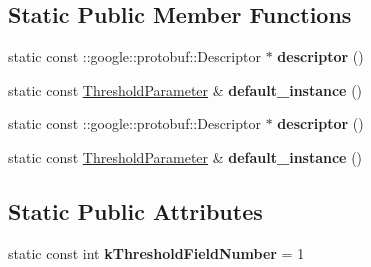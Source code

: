 \subsection*{Static Public Member Functions}
\begin{DoxyCompactItemize}
\item 
\mbox{\label{classcaffe_1_1_threshold_parameter_ac5ccc6db253564ef96fd9e65ddc4397e}} 
static const \+::google\+::protobuf\+::\+Descriptor $\ast$ {\bfseries descriptor} ()
\item 
\mbox{\label{classcaffe_1_1_threshold_parameter_aa4315dbfc60625e4375b7abf88d1646e}} 
static const \mbox{\hyperlink{classcaffe_1_1_threshold_parameter}{Threshold\+Parameter}} \& {\bfseries default\+\_\+instance} ()
\item 
\mbox{\label{classcaffe_1_1_threshold_parameter_a7fe6ef6623a56aadbdcf2f7c9a2e8da5}} 
static const \+::google\+::protobuf\+::\+Descriptor $\ast$ {\bfseries descriptor} ()
\item 
\mbox{\label{classcaffe_1_1_threshold_parameter_a4914b0e135a3d93145c789981d5adc0e}} 
static const \mbox{\hyperlink{classcaffe_1_1_threshold_parameter}{Threshold\+Parameter}} \& {\bfseries default\+\_\+instance} ()
\end{DoxyCompactItemize}
\subsection*{Static Public Attributes}
\begin{DoxyCompactItemize}
\item 
\mbox{\label{classcaffe_1_1_threshold_parameter_a9d67d7e79095e5011183fd4076e695d2}} 
static const int {\bfseries k\+Threshold\+Field\+Number} = 1
\end{DoxyCompactItemize}
